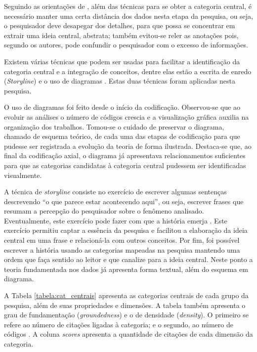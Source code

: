 Seguindo as orientações de , além das técnicas para se obter a categoria central, é necessário manter uma certa distância dos dados nesta etapa da pesquisa, ou seja, o pesquisador deve desapegar dos detalhes, para que possa se concentrar em extrair uma ideia central, abstrata; também evitou-se reler as anotações pois, segundo os autores, pode confundir o pesquisador com o excesso de informações.

Existem várias técnicas que podem ser usadas para facilitar a identificação da categoria central e a integração de conceitos, dentre elas estão a escrita de enredo (\textit{Storyline}) e o uso de diagramas \cite{corbin:98}. Estas duas técnicas foram aplicadas nesta pesquisa.

O uso de diagramas foi feito desde o início da codificação. Observou-se que ao evoluir as análises o número de códigos crescia e a visualização gráfica auxilia na organização dos trabalhos. Tomou-se o cuidado de preservar o diagrama, chamado de esquema teórico, de cada uma das etapas de codificação para que pudesse ser registrada a evolução da teoria de forma ilustrada. Destaca-se que, ao final da codificação axial, o diagrama já apresentava relacionamentos suficientes para que as categorias candidatas à categoria central pudessem ser identificadas visualmente.

A técnica de \textit{storyline} consiste no exercício de escrever algumas sentenças descrevendo ``o que parece estar acontecendo aqui'', ou seja, escrever frases que resumam a percepção do pesquisador sobre o fenômeno analisado. Eventualmente, este exercício pode fazer com que a história emerja \cite{corbin:98}. Este exercício permitiu captar a essência da pesquisa e facilitou a elaboração da ideia central em uma frase e relacioná-la com outros conceitos. Por fim, foi possível escrever a história usando as categorias mapeadas na pesquisa mantendo uma ordem que faça sentido ao leitor e que canalize para a ideia central. Neste ponto a teoria fundamentada nos dados já apresenta forma textual, além do esquema em diagrama.

A Tabela \ref{tabela:cat_centrais} apresenta as categorias centrais de cada grupo da pesquisa, além de suas propriedades e dimensões. A tabela também apresenta o grau de fundamentação (\textit{groundedness}) e o de densidade (\textit{density}). O primeiro se refere ao número de citações ligadas à categoria; e o segundo, ao número de códigos \cite{bandeira:03}. A coluna \textit{scores} apresenta a quantidade de citações de cada dimensão da categoria. 


